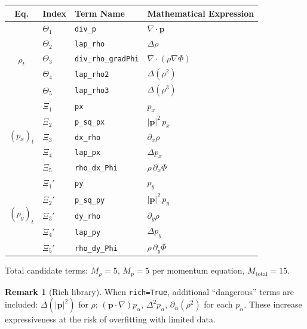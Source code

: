 \documentclass[11pt, letterpaper]{article}
\theoremstyle{definition}
\newtheorem{remark}{Remark}[section]
\newcommand{\vp}{\mathbf{p}}
\newcommand{\lap}{\Delta}
\newcommand{\bilap}{\Delta^{2}}
\newcommand{\divop}{\nabla\!\cdot}
\newcommand{\grad}{\nabla}
\begin{document}
\begin{center}
\renewcommand{\arraystretch}{1.35}
\begin{tabular}{clll}
  \toprule
  \textbf{Eq.} & \textbf{Index} & \textbf{Term Name} & \textbf{Mathematical Expression} \\
  \midrule
  \multirow{5}{*}{$\rho_t$}
    & $\Theta_1$ & \texttt{div\_p}         & $\divop\vp$                     \\
    & $\Theta_2$ & \texttt{lap\_rho}       & $\lap\rho$                      \\
    & $\Theta_3$ & \texttt{div\_rho\_gradPhi} & $\divop(\rho\grad\Phi)$      \\
    & $\Theta_4$ & \texttt{lap\_rho2}      & $\lap(\rho^{2})$                \\
    & $\Theta_5$ & \texttt{lap\_rho3}      & $\lap(\rho^{3})$                \\
  \midrule
  \multirow{5}{*}{$(p_x)_t$}
    & $\Xi_1$ & \texttt{px}              & $p_x$                            \\
    & $\Xi_2$ & \texttt{p\_sq\_px}       & $|\vp|^{2}\,p_x$                 \\
    & $\Xi_3$ & \texttt{dx\_rho}         & $\partial_x\rho$                  \\
    & $\Xi_4$ & \texttt{lap\_px}         & $\lap p_x$                        \\
    & $\Xi_5$ & \texttt{rho\_dx\_Phi}    & $\rho\,\partial_x\Phi$            \\
  \midrule
  \multirow{5}{*}{$(p_y)_t$}
    & $\Xi_1'$ & \texttt{py}             & $p_y$                             \\
    & $\Xi_2'$ & \texttt{p\_sq\_py}      & $|\vp|^{2}\,p_y$                  \\
    & $\Xi_3'$ & \texttt{dy\_rho}        & $\partial_y\rho$                   \\
    & $\Xi_4'$ & \texttt{lap\_py}        & $\lap p_y$                         \\
    & $\Xi_5'$ & \texttt{rho\_dy\_Phi}   & $\rho\,\partial_y\Phi$             \\
  \bottomrule
\end{tabular}
\end{center}

Total candidate terms: $M_{\rho} = 5$, $M_p = 5$ per momentum
equation, $M_{\mathrm{total}} = 15$.

\begin{remark}[Rich library]
When \texttt{rich=True}, additional ``dangerous'' terms are included:
$\lap(|\vp|^{2})$ for $\rho$;
$(\vp\cdot\grad)p_\alpha$, $\bilap p_\alpha$, $\partial_\alpha(\rho^{2})$
for each $p_\alpha$.  These increase expressiveness at the risk of
overfitting with limited data.
\end{remark}
\end{document}
